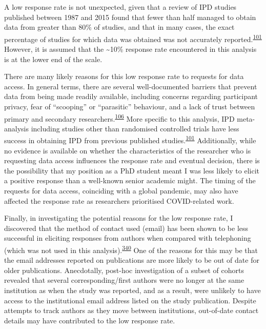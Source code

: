 \documentclass[a4paper, twoside]{templates/ociamthesis}
\begin{document}
A low response rate is not unexpected, given that a review of IPD studies published between 1987 and 2015 found that fewer than half managed to obtain data from greater than 80\% of studies, and that in many cases, the exact percentage of studies for which data was obtained was not accurately reported.\textsuperscript{\protect\hyperlink{ref-nevitt2017}{101}} However, it is assumed that the \textasciitilde10\% response rate encountered in this analysis is at the lower end of the scale.

There are many likely reasons for this low response rate to requests for data access. In general terms, there are several well-documented barriers that prevent data from being made readily available, including concerns regarding participant privacy, fear of ``scooping'' or ``parasitic'' behaviour, and a lack of trust between primary and secondary researchers.\textsuperscript{\protect\hyperlink{ref-vanpanhuis2014}{106}} More specific to this analysis, IPD meta-analysis including studies other than randomised controlled trials have less success in obtaining IPD from previous published studies.\textsuperscript{\protect\hyperlink{ref-nevitt2017}{101}} Additionally, while no evidence is available on whether the characteristics of the researcher who is requesting data access influences the response rate and eventual decision, there is the possibility that my position as a PhD student meant I was less likely to elicit a positive response than a well-known senior academic might. The timing of the requests for data access, coinciding with a global pandemic, may also have affected the response rate as researchers prioritised COVID-related work.

Finally, in investigating the potential reasons for the low response rate, I discovered that the method of contact used (email) has been shown to be less successful in eliciting responses from authors when compared with telephoning (which was not used in this analysis).\textsuperscript{\protect\hyperlink{ref-danko2019}{340}} One of the reasons for this may be that the email addresses reported on publications are more likely to be out of date for older publications. Anecdotally, post-hoc investigation of a subset of cohorts revealed that several corresponding/first authors were no longer at the same institution as when the study was reported, and as a result, were unlikely to have access to the institutional email address listed on the study publication. Despite attempts to track authors as they move between institutions, out-of-date contact details may have contributed to the low response rate.
\end{document}
